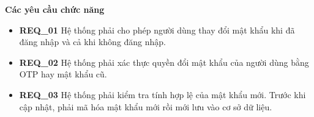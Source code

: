 \noindent \textbf{Các yêu cầu chức năng}

\begin{itemize}
  \item \textbf{REQ\_01} Hệ thống phải cho phép người dùng thay đổi mật khẩu khi đã đăng nhập và cả khi không đăng nhập.
  \item \textbf{REQ\_02} Hệ thống phải xác thực quyền đổi mật khẩu của người dùng bằng OTP hay mật khẩu cũ.
  \item \textbf{REQ\_03} Hệ thống phải kiểm tra tính hợp lệ của mật khẩu mới. Trước khi cập nhật, phải mã hóa mật khẩu mới rồi mới lưu vào cơ sở dữ liệu.
\end{itemize}